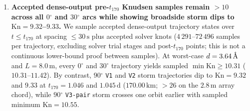 \documentclass[12pt]{article}
\newcommand{\unit}[1]{\,\mathrm{#1}}
\newcommand{\degree}{\ensuremath{{}^\circ}}
\begin{document}
\begin{enumerate}
\item \textbf{Accepted dense-output pre-$t_{170}$ Knudsen samples remain $>10$ across all $0\degree$ and $30\degree$ arcs while showing broadside storm dips to $\mathrm{Kn} = 9.32$--$9.33$.} We sample accepted dense-output trajectory states over $t \le t_{170}$ at spacing $\le 30\unit{s}$ plus accepted solver knots ($4\,291$--$72\,496$ samples per trajectory, excluding solver trial stages and post-$t_{170}$ points; this is not a continuous lower-bound proof between samples). At worst-case $d = 3.64\,\text{\normalfont\AA}$ and $L = 8.0\unit{m}$, every $0\degree$ and $30\degree$ trajectory yields sampled $\min\mathrm{Kn} \ge 10.31$ ($10.31$--$11.42$). By contrast, $90\degree$ \texttt{V1} and \texttt{V2} storm trajectories dip to $\mathrm{Kn} = 9.32$ and $9.33$ at $t_{170} = 1.046$ and $1.045\unit{d}$ ($170.00\unit{km}$; $> 26$ on the $2.8\unit{m}$ array chord), while $90\degree$ \texttt{V3-pair} storm crosses one orbit earlier with sampled minimum $\mathrm{Kn} = 10.55$.
\end{enumerate}
\end{document}
